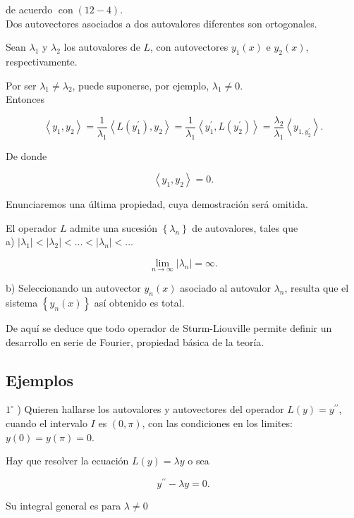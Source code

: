 \documentclass[10pt]{article}
\theoremstyle{plain}
\theoremstyle{definition}
\theoremstyle{remark}
\begin{document}
de acuerdo $\operatorname{con}(12-4)$.\\
Dos autovectores asociados a dos autovalores diferentes son ortogonales.

Sean $\lambda_{1}$ y $\lambda_{2}$ los autovalores de $L$, con autovectores $y_{1}(x)$ e $y_{2}(x)$, respectivamente.

Por ser $\lambda_{1} \neq \lambda_{2}$, puede suponerse, por ejemplo, $\lambda_{1} \neq 0$.\\
Entonces

$$
\left\langle y_{1}, y_{2}\right\rangle=\frac{1}{\lambda_{1}}\left\langle L\left(y_{1}^{\prime}\right), y_{2}\right\rangle=\frac{1}{\lambda_{1}}\left\langle y_{1}^{\prime}, L\left(y_{2}^{\prime}\right)\right\rangle=\frac{\lambda_{2}}{\lambda_{1}}\left\langle y_{1, y_{2}^{\prime}}\right\rangle .
$$

De donde


$$
\left\langle y_{1}, y_{2}\right\rangle=0 .
$$

Enunciaremos una última propiedad, cuya demostración será omitida.

El operador $L$ admite una sucesión $\left\{\lambda_{n}\right\}$ de autovalores, tales que\\
a) $\left|\lambda_{1}\right|<\left|\lambda_{2}\right|<\ldots<\left|\lambda_{n}\right|<\ldots$

$$
\lim _{n \rightarrow \infty}\left|\lambda_{n}\right|=\infty .
$$

b) Seleccionando un autovector $y_{n}(x)$ asociado al autovalor $\lambda_{n}$, resulta que el sistema $\left\{y_{n}(x)\right\}$ así obtenido es total.

De aquí se deduce que todo operador de Sturm-Liouville permite definir un desarrollo en serie de Fourier, propiedad básica de la teoría.

\subsection{Ejemplos}
$1^{\circ}$ ) Quieren hallarse los autovalores y autovectores del operador $L(y)=y^{\prime \prime}$, cuando el intervalo $I$ es $(0, \pi)$, con las condiciones en los limites: $y(0)=y(\pi)=0$.

Hay que resolver la ecuación $L(y)=\lambda y$ o sea


\begin{equation*}
y^{\prime \prime}-\lambda y=0 . \tag{12-6}
\end{equation*}


Su integral general es para $\lambda \neq 0$
\end{document}
